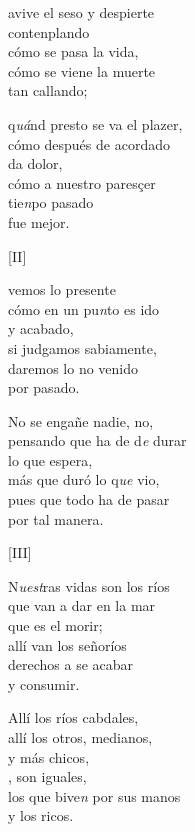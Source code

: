 \documentclass[11pt,a4paper,twoside]{article}
\begin{document}
avive el seso y despierte\\
contenplando\\
cómo se pasa la vida,\\
cómo se viene la muerte\\
tan callando;\par
q\textit{uá}nd presto se va el plazer,\\
cómo después de acordado\\
da dolor,\\
cómo a nuestro paresçer\\
 tie\textit{n}po pasado \\
fue mejor.\par
\pend

\begin{center}
		[II]
\end{center}
\pstart
{} vemos lo presente\\
cómo en un pu\textit{n}to  es ido\\
y acabado,\\
si judgamos sabiamente,\\
daremos lo no venido\\
por pasado.\par
No se engañe nadie, no,\\
pensando que ha de d\textit{e} durar\\ 
lo que espera,\\
más que duró lo q\textit{ue} vio,\\
pues que todo ha de pasar\\
por tal manera.\par
\pend

\begin{center}
		[III]
\end{center}
\pstart
N\textit{uest}ras vidas son los ríos\\
que van a dar en la mar\\
que es el morir;\\
allí van los señoríos\\
derechos a se acabar\\
y consumir.\par
Allí los ríos cabdales,\\
allí los otros, medianos,\\
y más chicos,\\
, son iguales,\\
los que bive\textit{n} por sus manos\\
y los ricos.\par
\pend
\end{document}

